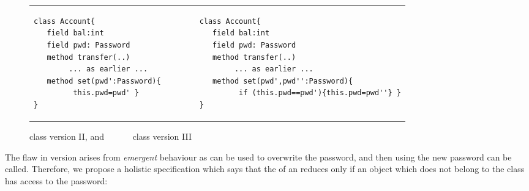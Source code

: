 %
  
  
 
 \begin{figure}[hbtp]
 \begin{tabular}{lll}
\begin{minipage}{0.35\textwidth}
\begin{lstlisting}
class Account{
   field bal:int 
   field pwd: Password 
   method transfer(..) 
        ... as earlier ...
   method set(pwd':Password){
         this.pwd=pwd' }
}   
\end{lstlisting}
\end{minipage}
  &\ \ \  \ \   &
\begin{minipage}{0.50\textwidth}
\begin{lstlisting}
class Account{
   field bal:int 
   field pwd: Password 
   method transfer(..) 
        ... as earlier ...
   method set(pwd',pwd'':Password){
         if (this.pwd==pwd'){this.pwd=pwd''} }
}
\end{lstlisting}
\end{minipage} 
 \end{tabular}
  \caption{class  version II, and \ \ \ \ \ \  class  version III}
 \label{fig:ExampleAccount}
 \end{figure}

 
 The flaw in version {} arises from \emph{emergent} behaviour as  
 can be used to overwrite the
 password, and then using the new password   can be called.
 Therefore, we propose a holistic specification which says that
 the  of an  reduces only if an object which does not belong to the
 class  has access to the password:
 
